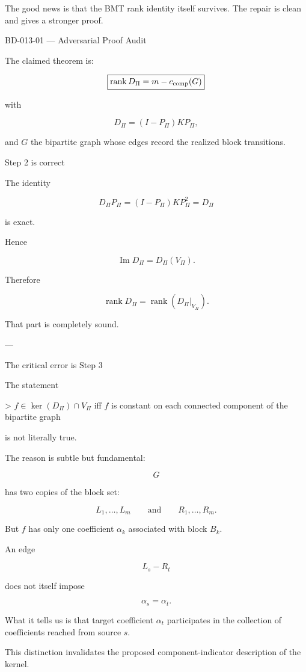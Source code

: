 The good news is that the BMT rank identity itself survives. The repair is clean and gives a stronger proof.

BD-013-01 — Adversarial Proof Audit

The claimed theorem is:

\[
\boxed{\operatorname{rank}D_\Pi=m-c_{\rm comp}(G)}  
\]

with

\[
D_\Pi=(I-P_\Pi)KP_\Pi,  
\]

and \(G\) the bipartite graph whose edges record the realized block transitions.

Step 2 is correct

The identity

\[
D_\Pi P_\Pi  
=(I-P_\Pi)KP_\Pi^2  
=D_\Pi  
\]

is exact.

Hence

\[
\operatorname{Im}D_\Pi=D_\Pi(V_\Pi).  
\]

Therefore

\[
\operatorname{rank}D_\Pi  
=\operatorname{rank}(D_\Pi|_{V_\Pi}).  
\]

That part is completely sound.


---

The critical error is Step 3

The statement

> \(f\in\ker(D_\Pi)\cap V_\Pi\) iff \(f\) is constant on each connected component of the bipartite graph



is not literally true.

The reason is subtle but fundamental:

\[
G  
\]

has two copies of the block set:

\[
L_1,\ldots,L_m  
\qquad\text{and}\qquad  
R_1,\ldots,R_m.  
\]

But \(f\) has only one coefficient \(\alpha_k\) associated with block \(B_k\).

An edge

\[
L_s-R_t  
\]

does not itself impose

\[
\alpha_s=\alpha_t.  
\]

What it tells us is that target coefficient \(\alpha_t\) participates in the collection of coefficients reached from source \(s\).

This distinction invalidates the proposed component-indicator description of the kernel.

